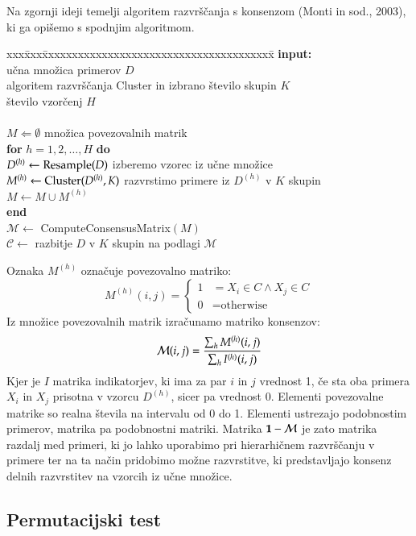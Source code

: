 Na zgornji ideji temelji algoritem razvrščanja s
konsenzom (Monti in sod., 2003), ki ga opišemo s spodnjim algoritmom.

\begin{tabbing}
xxx\=xxx\=xxxxxxxxxxxxxxxxxxxxxxxxxxxxxxxxxxxxxxx\=\kill
{\bf input:} \\
\> učna množica primerov $D$ \\
\> algoritem razvrščanja Cluster in izbrano število skupin $K$ \\
\> število vzorčenj $H$ \\
\\
$M\Leftarrow\emptyset$ \>\>\> množica povezovalnih matrik\\
{\bf for} $h=1,2,\ldots, H$ {\bf do} \\
\> $D^{(h)}\leftarrow {\rm Resample}(D)$ \>\> izberemo vzorec iz
učne množice \\
\> $M^{(h)}\leftarrow {\rm Cluster}(D^{(h)}, K)$ \>\> razvrstimo
primere iz $D^{(h)}$ v $K$ skupin \\
\> $M\leftarrow M\cup M^{(h)}$ \\
{\bf end} \\
$\mathcal{M}\leftarrow$ ComputeConsensusMatrix$(M)$ \\
$\mathcal{C}\leftarrow$ razbitje $D$ v $K$ skupin na podlagi $\mathcal{M}$
\end{tabbing}

Oznaka $M^{(h)}$ označuje povezovalno matriko:
$$ M^{(h)}(i,j) = \left\{
     \begin{array}{ll}
       1 & = X_i\in C\wedge X_j\in C \\
       0 & = \text{otherwise}
     \end{array}
   \right.$$
Iz množice povezovalnih matrik izračunamo matriko konsenzov:
$$ \mathcal{M}(i,j) = {\sum_h M^{(h)}(i,j) \over \sum_h
  I^{(h)}(i,j)} $$
Kjer je $I$ matrika indikatorjev, ki ima za par $i$ in $j$ vrednost 1,
če sta oba primera $X_i$ in $X_j$ prisotna v vzorcu $D^{(h)}$, sicer
pa vrednost 0. Elementi povezovalne matrike so realna števila na
intervalu od 0 do 1. Elementi ustrezajo podobnostim primerov, matrika
pa podobnostni matriki. Matrika ${\bf 1}-\mathcal{M}$ je zato matrika
razdalj med primeri, ki jo lahko uporabimo pri hierarhičnem
razvrščanju v primere ter na ta način pridobimo možne razvrstitve, ki
predstavljajo konsenz delnih razvrstitev na vzorcih iz učne množice.

\subsection{Permutacijski test}

